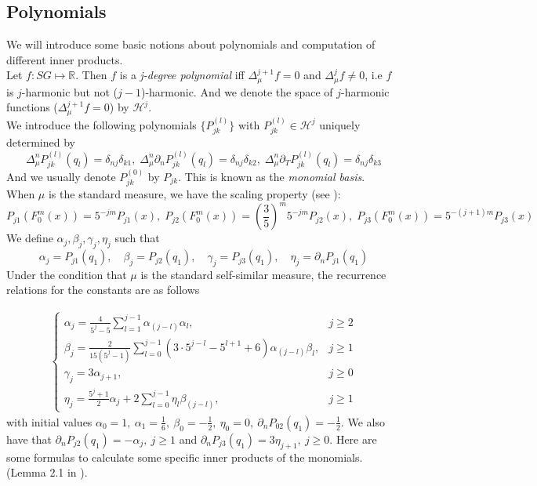 \documentclass[12pt]{amsart}
\theoremstyle{plain}
\theoremstyle{definition}
\begin{document}
\subsection{Polynomials} We will introduce some basic notions about polynomials and computation of different inner products.\\
Let $f: SG \mapsto \mathbb{R}$. Then $f$ is a \textit{j-degree polynomial} iff
        $\Delta_\mu^{j+1}f = 0$ and $\Delta_\mu^{j}f\neq 0$, i.e $f$ is $j$-harmonic but not ($j-1$)-harmonic. And we denote the space of $j$-harmonic functions ($\Delta_\mu^{j+1}f = 0$) by $\mathcal H^j$. \\
        We introduce the following polynomials $\{P^{(l)}_{jk}\}$ with $P^{(l)}_{jk}\in \mathcal H^j$ uniquely determined by
        $$
            \Delta^n_\mu P_{jk}^{(l)}(q_l)= \delta_{nj}\delta_{k1},\; \Delta^n_\mu\partial_nP^{(l)}_{jk}(q_l)= \delta_{nj}\delta_{k2},\; 
            \Delta^n_\mu\partial_TP^{(l)}_{jk}(q_l)= \delta_{nj}\delta_{k3}
        $$ And we usually denote $P_{jk}^{(0)}$ by $P_{jk}$.
        This is known as the \textit{monomial basis}.\\
When $\mu$ is the standard measure, we have the scaling property (see \cite{NSTY}): 
$$P_{j1}(F_0^m(x))=5^{-jm}P_{j1}(x),\;P_{j2}(F_0^m(x))=(\frac 35)^m5^{-jm}P_{j2}(x),\;P_{j3}(F_0^m(x))=5^{-(j+1)m}P_{j3}(x)$$
We define $\alpha_j, \beta_j, \gamma_j, \eta_j$ such that 
$$\alpha_j = P_{j1}(q_1), \quad \beta_j = P_{j2}(q_1), \quad \gamma_j = P_{j3}(q_1), \quad \eta_j = \partial_nP_{j1}(q_1)$$
Under the condition that $\mu$ is the standard self-similar measure, the recurrence relations for the constants are as follows \cite{NSTY}

\begin{gather}
    \begin{cases}
    \alpha_j = \frac{4}{5^j - 5}\sum\limits_{l=1}^{j-1}\alpha_{(j-l)}\alpha_l, & j \geq 2\\
    \beta_j = \frac{2}{15(5^j - 1)}\sum\limits_{l=0}^{j-1}(3\cdot 5^{j-l} - 5^{l+1} + 6)\alpha_{(j-l)}\beta_l, & j \geq 1\\
    \gamma_j = 3\alpha_{j+1}, & j \geq 0\\
    \eta_j = \frac{5^j +1}{2}\alpha_j + 2\sum\limits_{l=0}^{j-1}\eta_l\beta_{(j-l)}, & j \geq 1
    \end{cases}
\end{gather}
with initial values $\alpha_0 = 1,\ \alpha_1 = \frac16, \ \beta_0 = -\frac12, \ \eta_0 = 0, \ \partial_nP_{02}(q_1) = -\frac12$. We also have that $\partial_nP_{j2}(q_1) = -\alpha_j,\ j \geq 1$ and $\partial_nP_{j3}(q_1) = 3\eta_{j+1},\ j \geq 0$. Here are some formulas to calculate some specific inner products of the monomials. (Lemma 2.1 in \cite{OST}).
\end{document}

